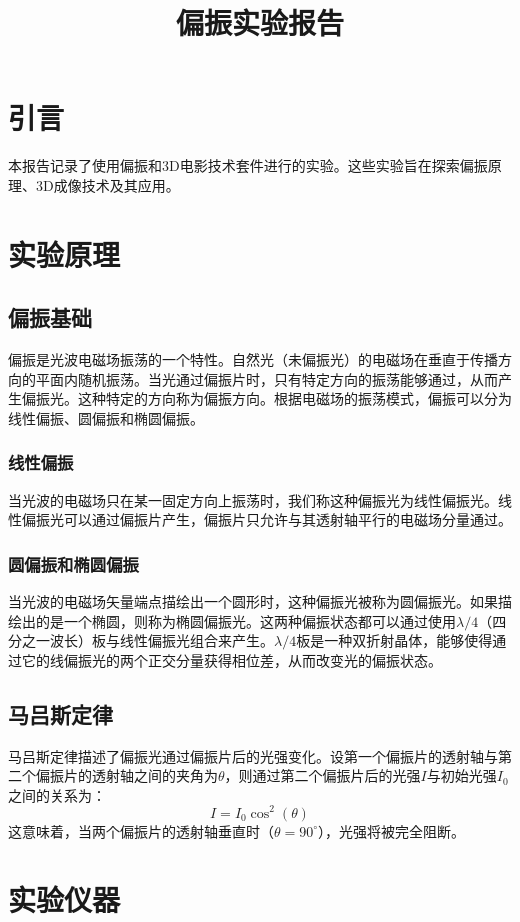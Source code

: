 \documentclass{ctexart}
\title{偏振实验报告}
\begin{document}
\maketitle

\section{引言}
本报告记录了使用偏振和3D电影技术套件进行的实验。这些实验旨在探索偏振原理、3D成像技术及其应用。
\section{实验原理}

\subsection{偏振基础}
偏振是光波电磁场振荡的一个特性。自然光（未偏振光）的电磁场在垂直于传播方向的平面内随机振荡。当光通过偏振片时，只有特定方向的振荡能够通过，从而产生偏振光。这种特定的方向称为偏振方向。根据电磁场的振荡模式，偏振可以分为线性偏振、圆偏振和椭圆偏振。

\subsubsection{线性偏振}
当光波的电磁场只在某一固定方向上振荡时，我们称这种偏振光为线性偏振光。线性偏振光可以通过偏振片产生，偏振片只允许与其透射轴平行的电磁场分量通过。

\subsubsection{圆偏振和椭圆偏振}
当光波的电磁场矢量端点描绘出一个圆形时，这种偏振光被称为圆偏振光。如果描绘出的是一个椭圆，则称为椭圆偏振光。这两种偏振状态都可以通过使用$\lambda/4$（四分之一波长）板与线性偏振光组合来产生。$\lambda/4$板是一种双折射晶体，能够使得通过它的线偏振光的两个正交分量获得相位差，从而改变光的偏振状态。

\subsection{马吕斯定律}
马吕斯定律描述了偏振光通过偏振片后的光强变化。设第一个偏振片的透射轴与第二个偏振片的透射轴之间的夹角为$\theta$，则通过第二个偏振片后的光强$I$与初始光强$I_0$之间的关系为：
\[ I = I_0 \cos^2(\theta) \]
这意味着，当两个偏振片的透射轴垂直时（$\theta = 90^\circ$），光强将被完全阻断。
\section{实验仪器}
\end{document}
